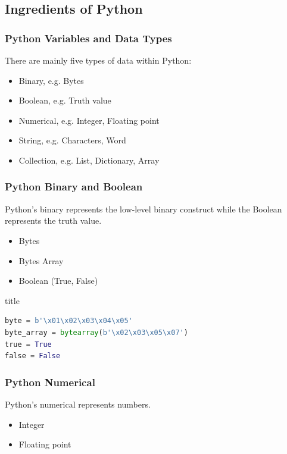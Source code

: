 \documentclass{beamer}
\begin{document}
    \subsection{Ingredients of Python}
    \begin{frame}[fragile]
        \frametitle{Python Variables and Data Types}
        There are mainly five types of data within Python:
        \begin{itemize}
            \item Binary, e.g. Bytes
            \item Boolean, e.g. Truth value
            \item Numerical, e.g. Integer, Floating point
            \item String, e.g. Characters, Word
            \item Collection, e.g. List, Dictionary, Array
        \end{itemize}
    \end{frame}

    \begin{frame}[fragile]
        \frametitle{Python Binary and Boolean}
        Python's binary represents the low-level binary construct while the Boolean represents the truth value.
        \begin{itemize}
            \item Bytes
            \item Bytes Array
            \item Boolean (True, False)
        \end{itemize}
        \begin{exampleblock}{title}
            \begin{lstlisting}[language=python]
byte = b'\x01\x02\x03\x04\x05'
byte_array = bytearray(b'\x02\x03\x05\x07')
true = True
false = False
            \end{lstlisting}
        \end{exampleblock}
    \end{frame}

    \begin{frame}[fragile]
        \frametitle{Python Numerical}
        Python's numerical represents numbers.
        \begin{itemize}
            \item Integer
            \item Floating point
        \end{itemize}
    \end{frame}
\end{document}
